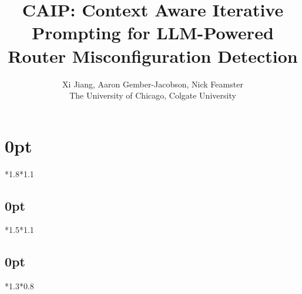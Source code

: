 \usepackage{caption}
\usepackage{ltablex}

\usepackage{ifluatex}

\usepackage{outlines}
\newtheorem{insight}{Insight}

\captionsetup[figure]{belowskip=0pt}
\captionsetup[figure]{skip=0pt}
\captionsetup[table]{belowskip=0pt}
\captionsetup[table]{skip=0pt}


\usepackage[compact]{titlesec}
\renewcommand{\paragraph}[1]{\noindent\textbf{#1}}
\setlength{\textfloatsep}{5pt plus 0pt minus 2.0pt}
\titlespacing\section{0pt}{*1.8}{*1.1}
\titlespacing\subsection{0pt}{*1.5}{*1.1}
\titlespacing\subsection{0pt}{*1.3}{*0.8}
\usepackage{booktabs}



\newcommand*{\affmark}[1][*]{\textsuperscript{#1}}
\newcommand*{\affaddr}[1]{#1}

\title{CAIP: Context Aware Iterative Prompting for LLM-Powered Router Misconfiguration Detection}


\author{Xi Jiang, Aaron Gember-Jacobson, Nick Feamster \\
The University of Chicago, Colgate University}
\newcommand{\eg}{{\it e.g.}}
\newcommand{\ie}{{\it i.e.}}
\newcommand{\etal}{{\it et al.}}
\newcommand{\sysname}{{CAIP}}



